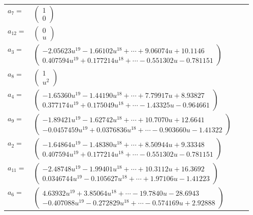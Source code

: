 \documentclass[1p]{elsarticle_modified}
\theoremstyle{definition}
\begin{document}
\begin{tabular}{m{7pt} m{180pt} m{7pt} m{180pt} }
\flushright $a_{7}=$&$\begin{pmatrix}1\\0\end{pmatrix}$ \\
\flushright $a_{12}=$&$\begin{pmatrix}0\\u\end{pmatrix}$ \\
\flushright $a_{3}=$&$\begin{pmatrix}-2.05623 u^{19}-1.66102 u^{18}+\cdots+9.06074 u+10.1146\\0.407594 u^{19}+0.177214 u^{18}+\cdots-0.551302 u-0.781151\end{pmatrix}$ \\
\flushright $a_{8}=$&$\begin{pmatrix}1\\u^2\end{pmatrix}$ \\
\flushright $a_{4}=$&$\begin{pmatrix}-1.65360 u^{19}-1.44190 u^{18}+\cdots+7.79917 u+8.93827\\0.377174 u^{19}+0.175049 u^{18}+\cdots-1.43325 u-0.964661\end{pmatrix}$ \\
\flushright $a_{9}=$&$\begin{pmatrix}-1.89421 u^{19}-1.62742 u^{18}+\cdots+10.7070 u+12.6641\\-0.0457459 u^{19}+0.0376836 u^{18}+\cdots-0.903660 u-1.41322\end{pmatrix}$ \\
\flushright $a_{2}=$&$\begin{pmatrix}-1.64864 u^{19}-1.48380 u^{18}+\cdots+8.50944 u+9.33348\\0.407594 u^{19}+0.177214 u^{18}+\cdots-0.551302 u-0.781151\end{pmatrix}$ \\
\flushright $a_{11}=$&$\begin{pmatrix}-2.48748 u^{19}-1.99401 u^{18}+\cdots+10.3112 u+16.3692\\0.0346744 u^{19}-0.105627 u^{18}+\cdots+1.97106 u-1.41223\end{pmatrix}$ \\
\flushright $a_{6}=$&$\begin{pmatrix}4.63932 u^{19}+3.85064 u^{18}+\cdots-19.7840 u-28.6943\\-0.407088 u^{19}-0.272829 u^{18}+\cdots-0.574169 u+2.92888\end{pmatrix}$ \\

\end{tabular}
\end{document}
